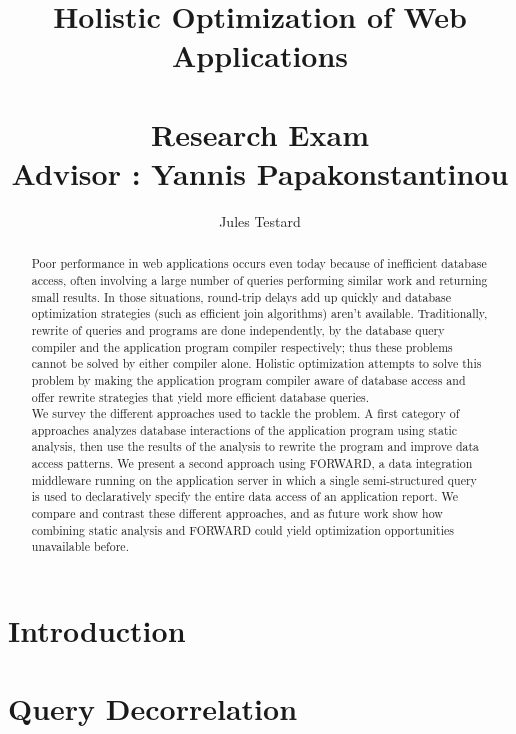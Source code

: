 \documentclass[10pt]{article}
\begin{document}
\title{Holistic Optimization of Web Applications \\
\hspace{1 mm} \\
\large Research Exam \\
Advisor : Yannis Papakonstantinou}
\author{Jules Testard}
\date{}
\maketitle

\begin{abstract}
Poor performance in web applications occurs even today because of inefficient database access, often involving a large number of queries performing similar work and returning small results. In those situations, round-trip delays add up quickly and database optimization strategies (such as efficient join algorithms) aren’t available. Traditionally, rewrite of queries and programs are done independently, by the database query compiler and the application program compiler respectively; thus these problems cannot be solved by either compiler alone. Holistic optimization attempts to solve this problem by making the application program compiler aware of database access and offer rewrite strategies that yield more efficient database queries.\\

We survey the different approaches used to tackle the problem. A first category of approaches analyzes database interactions of the application program using static analysis, then use the results of the analysis to rewrite the program and improve data access patterns. We present a second approach using FORWARD, a data integration middleware running on the application server in which a single semi-structured query is used to declaratively specify the entire data access of an application report. We compare and contrast these different approaches, and as future work show how combining static analysis and FORWARD could yield optimization opportunities unavailable before.
\end{abstract}

\section{Introduction}



\section{Query Decorrelation}
\end{document}
